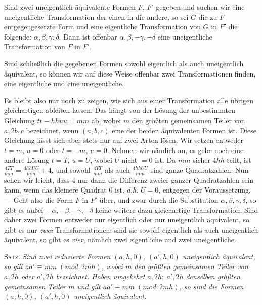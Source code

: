 Sind zwei uneigentlich äquivalente Formen $F$, $F'$ gegeben und suchen wir eine uneigentliche Transformation der einen in die andere, so sei $G$ die zu $F$ entgegengesetzte Form und eine eigentliche Transformation von $G$ in $F'$ die folgende: $\alpha,\beta,\gamma.\ \delta$. Dann ist offenbar $\alpha,\beta,-\gamma,-\delta$ eine uneigentliche Transformation von $F$ in $F'$.

Sind schließlich die gegebenen Formen sowohl eigentlich als auch uneigentlich äquivalent, so können wir auf diese Weise offenbar zwei Transformationen finden, eine eigentliche und eine uneigentliche.

Es bleibt also nur noch zu zeigen, wie sich aus einer Transformation alle übrigen gleichartigen ableiten lassen. Das hängt von der Lösung der unbestimmten Gleichung $tt-hhuu=mm$ ab, wobei $m$ den größten gemeinsamen Teiler von $a,2b,c$ bezeichnet, wenn $(a,b,c)$ eine der beiden äquivalenten Formen ist. Diese Gleichung lässt sich aber stets nur auf zwei Arten lösen: Wir setzen entweder $t=m$, $u=0$ oder $t=-m$, $u=0$. Nehmen wir nämlich an, es gebe noch eine andere Lösung $t=T$, $u=U$, wobei $U$ nicht $=0$ ist. Da $mm$ sicher $4hh$ teilt, ist $\frac{4TT}{mm}=\frac{4hhUU}{mm}+4$, und sowohl $\frac{4TT}{mm}$ als auch $\frac{4hhUU}{mm}$ sind ganze Quadratzahlen. Nun sehen wir leicht, dass $4$ nur dann die Differenz zweier ganzer Quadratzahlen sein kann, wenn das kleinere Quadrat $0$ ist, \textit{d.h.} $U=0$, entgegen der Voraussetzung. --- Geht also die Form $F$ in $F'$ über, und zwar durch die Substitution $\alpha,\beta,\gamma,\delta$, so gibt es außer $-\alpha,-\beta,-\gamma,-\delta$ keine weitere dazu gleichartige Transformation. Sind daher zwei Formen entweder nur eigentlich oder nur uneigentlich äquivalent, so gibt es nur \textit{zwei} Transformationen; sind sie sowohl eigentlich als auch uneigentlich äquivalent, so gibt es \textit{vier}, nämlich zwei eigentliche und zwei uneigentliche.

\textsc{Satz.} \textit{Sind zwei reduzierte Formen $(a,h,0)$, $(a',h,0)$ uneigentlich äquivalent, so gilt $aa'\equiv mm\;(\mathit{mod.}\,2mh)$, wobei $m$ den größten gemeinsamen Teiler von $a,2h$ oder $a',2h$ bezeichnet. Haben umgekehrt $a,2h;\ a',2h$ denselben größten gemeinsamen}
\textit{Teiler $m$ und gilt $aa'\equiv mm\;(\mathit{mod.}\,2mh)$, so sind die Formen $(a,h,0)$, $(a',h,0)$ uneigentlich äquivalent.}

